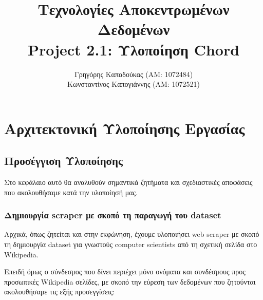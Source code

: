 \documentclass[12pt,a4paper]{article}
\title{Τεχνολογίες Αποκεντρωμένων Δεδομένων\\Project 2.1: Υλοποίηση Chord}
\author{Γρηγόρης Καπαδούκας (ΑΜ: 1072484)\\Κωνσταντίνος Καπογιάννης (ΑΜ: 1072521)}
\begin{document}
\maketitle
\section{Αρχιτεκτονική Υλοποίησης Εργασίας}
\label{implementation}

\subsection{Προσέγγιση Υλοποίησης}

Στο κεφάλαιο αυτό θα αναλυθούν σημαντικά ζητήματα και σχεδιαστικές αποφάσεις που ακολουθήσαμε κατά την υλοποίησή μας.

\subsubsection{Δημιουργία scraper με σκοπό τη παραγωγή του dataset}

Αρχικά, όπως ζητείται και στην εκφώνηση, έχουμε υλοποιήσει web scraper με σκοπό τη δημιουργία dataset για γνωστούς computer scientists από τη σχετική σελίδα στο Wikipedia.

Επειδή όμως ο σύνδεσμος που δίνει περιέχει μόνο ονόματα και συνδέσμους προς προσωπικές Wikipedia σελίδες, με σκοπό την εύρεση των δεδομένων που ζητούνται ακολουθήσαμε τις εξής προσεγγίσεις:
\end{document}
